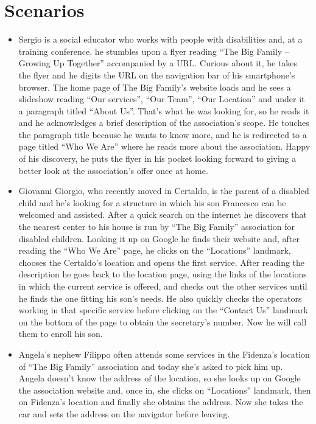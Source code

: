 %
%
\chapter{Scenarios}
%
%
\begin{itemize}
\item Sergio is a social educator who works with people with disabilities and, at a training conference, he stumbles upon a flyer reading “The Big Family – Growing Up Together” accompanied by a URL. Curious about it, he takes the flyer and he digits the URL on the navigation bar of his smartphone’s browser. The home page of The Big Family’s website loads and he sees a slideshow reading “Our services”, “Our Team”, “Our Location” and under it a paragraph titled “About Us”. That’s what he was looking for, so he reads it and he acknowledges a brief description of the association’s scope. He touches the paragraph title because he wants to know more, and he is redirected to a page titled “Who We Are” where he reads more about the association. Happy of his discovery, he puts the flyer in his pocket looking forward to giving a better look at the association’s offer once at home.
\item Giovanni Giorgio, who recently moved in Certaldo, is the parent of a disabled child and he’s looking for a structure in which his son Francesco can be welcomed and assisted. After a quick search on the internet he discovers that the nearest center to his house is run by “The Big Family” association for disabled children. Looking it up on Google he finds their website and, after reading the “Who We Are” page, he clicks on the “Locations” landmark, chooses the Certaldo’s location and opens the first service. After reading the description he goes back to the location page, using the links of the locations in which the current service is offered, and checks out the other services until he finds the one fitting his son’s needs. He also quickly checks the operators working in that specific service before clicking on the “Contact Us” landmark on the bottom of the page to obtain the secretary’s number. Now he will call them to enroll his son.
\item Angela’s nephew Filippo often attends some services in the Fidenza’s location of “The Big Family” association and today she’s asked to pick him up. Angela doesn’t know the address of the location, so she looks up on Google the association website and, once in, she clicks on “Locations” landmark, then on Fidenza’s location and finally she obtains the address. Now she takes the car and sets the address on the navigator before leaving.
\end{itemize}%
